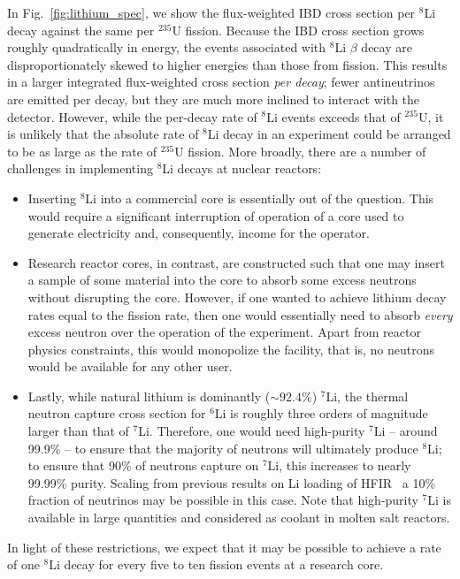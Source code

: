 \documentclass[prd, twocolumn, tightenlines, twoside, secnumarabic, superscriptaddress, preprintnumbers, nofootinbib, notitlepage]{revtex4-1}
\begin{document}
In Fig.~\ref{fig:lithium_spec}, we show the flux-weighted IBD cross section per $^8$Li decay against the same per $^{235}$U fission. Because the IBD cross section grows roughly quadratically in energy, the events associated with $^8$Li $\beta$ decay are disproportionately skewed to higher energies than those from fission. This results in a larger integrated flux-weighted cross section \emph{per decay}; fewer antineutrinos are emitted per decay, but they are much more inclined to interact with the detector. However, while the per-decay rate of $^8$Li events exceeds that of $^{235}$U, it is unlikely that the absolute rate of $^8$Li decay in an experiment could be arranged to be as large as the rate of $^{235}$U fission. More broadly, there are a number of challenges in implementing $^8$Li decays at nuclear reactors:
\begin{itemize}
    \item Inserting $^8$Li into a commercial core is essentially out of the question. This would require a significant interruption of operation of a core used to generate electricity and, consequently, income for the operator. %
    \item Research reactor cores, in contrast, are  constructed such that one may insert a sample of some material into the core to absorb some excess neutrons without disrupting the core. However, if one wanted to achieve lithium decay rates equal to the fission rate, then one would essentially need to absorb \emph{every} excess neutron over the operation of the experiment. Apart from reactor physics constraints, this would monopolize the facility, that is, no neutrons would be available for any other user.
    \item Lastly, while natural lithium is dominantly ($\sim92.4\%$) $^7$Li, the thermal neutron capture cross section for $^6$Li is roughly three orders of magnitude larger than that of $^7$Li. Therefore, one would need high-purity $^7$Li -- around 99.9\% -- to ensure that the majority of neutrons will ultimately produce $^8$Li; to ensure that 90\% of neutrons capture on $^7$Li, this increases to nearly 99.99\% purity. Scaling from previous results on Li loading of HFIR~\cite{conant} a 10\% fraction of neutrinos may be possible in this case. Note that high-purity $^7$Li is available in large quantities and considered as coolant in molten salt reactors.
\end{itemize}
In light of these restrictions, we expect that it may be possible to achieve a rate of one $^8$Li decay for every five to ten fission events at a research core.
\end{document}
